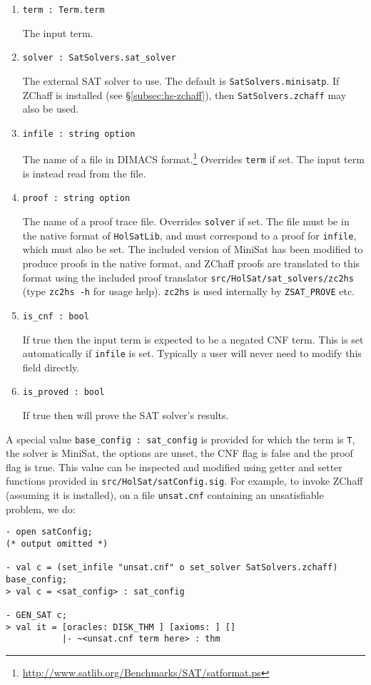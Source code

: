 \begin{enumerate}
\item{\texttt{term : Term.term}}

The input term.
\item{\texttt{solver : SatSolvers.sat\_solver}}

The external SAT solver to use. The default is \texttt{SatSolvers.minisatp}. If ZChaff is installed (see \S\ref{subsec:hs-zchaff}), then \texttt{SatSolvers.zchaff} may also be used.
\item{\texttt{infile : string option}}

The name of a file in DIMACS format.\footnote{\url{http://www.satlib.org/Benchmarks/SAT/satformat.ps}} Overrides \texttt{term} if set. The input term is instead read from the file.
\item{\texttt{proof : string option}}

The name of a proof trace file. Overrides \texttt{solver} if set. The file must be in the native format of {\tt{HolSatLib}}, and must correspond to a proof for \texttt{infile}, which must also be set. The included version of MiniSat has been modified to produce proofs in the native format, and ZChaff proofs are translated to this format using the included proof translator \texttt{src/HolSat/sat\_solvers/zc2hs} (type \texttt{zc2hs -h} for usage help). \texttt{zc2hs} is used internally by \texttt{ZSAT\_PROVE} etc.
\item{\texttt{is\_cnf : bool}}

If true then the input term is expected to be a negated CNF term. This is set automatically if \texttt{infile} is set. Typically a user will never need to modify this field directly.
\item{\texttt{is\_proved : bool}}

If true then \HOL{} will prove the SAT solver's results.
\end{enumerate}

A special value \texttt{base\_config~:~sat\_config} is provided for which the term is \texttt{T}, the solver is MiniSat, the options are unset, the CNF flag is false and the proof flag is true. This value can be inspected and modified using getter and setter functions provided in \texttt{src/HolSat/satConfig.sig}. For example, to invoke ZChaff (assuming it is installed), on a file \texttt{unsat.cnf} containing an unsatisfiable problem, we do:

\begin{session}
\begin{verbatim}
- open satConfig;
(* output omitted *)

- val c = (set_infile "unsat.cnf" o set_solver SatSolvers.zchaff) base_config;
> val c = <sat_config> : sat_config

- GEN_SAT c;
> val it = [oracles: DISK_THM ] [axioms: ] []
           |- ~<unsat.cnf term here> : thm
\end{verbatim}
\end{session}

